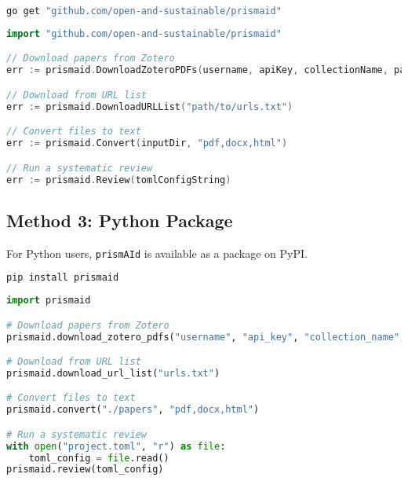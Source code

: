 \begin{commandbox}
\begin{lstlisting}[language=Bash]
go get "github.com/open-and-sustainable/prismaid"
\end{lstlisting}
\end{commandbox}

\begin{commandbox}
\begin{lstlisting}[language=Go]
import "github.com/open-and-sustainable/prismaid"

// Download papers from Zotero
err := prismaid.DownloadZoteroPDFs(username, apiKey, collectionName, parentDir)

// Download from URL list
err := prismaid.DownloadURLList("path/to/urls.txt")

// Convert files to text
err := prismaid.Convert(inputDir, "pdf,docx,html")

// Run a systematic review
err := prismaid.Review(tomlConfigString)
\end{lstlisting}
\end{commandbox}

\subsection{Method 3: Python Package}

For Python users, \texttt{prismAId} is available as a package on PyPI.

\begin{commandbox}
\begin{lstlisting}[language=Bash]
pip install prismaid
\end{lstlisting}
\end{commandbox}

\begin{commandbox}
\begin{lstlisting}[language=Python]
import prismaid

# Download papers from Zotero
prismaid.download_zotero_pdfs("username", "api_key", "collection_name", "./papers")

# Download from URL list
prismaid.download_url_list("urls.txt")

# Convert files to text
prismaid.convert("./papers", "pdf,docx,html")

# Run a systematic review
with open("project.toml", "r") as file:
    toml_config = file.read()
prismaid.review(toml_config)
\end{lstlisting}
\end{commandbox}

